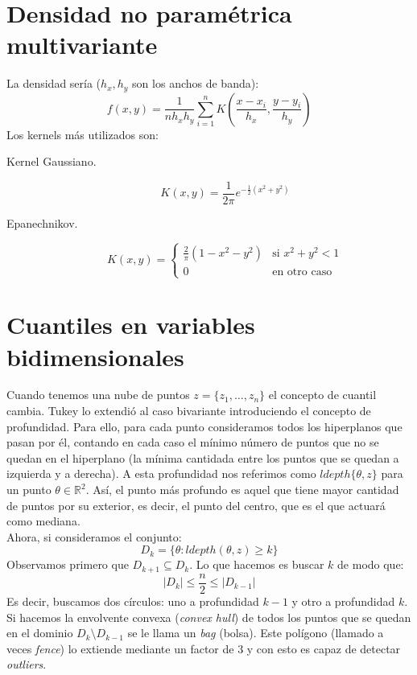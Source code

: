 \section{Densidad no paramétrica multivariante}
\noindent
La densidad sería ($h_x,h_y$ son los anchos de banda):
\begin{equation*}
    f(x,y) = \frac{1}{nh_xh_y}\sum_{i=1}^{n}K\left(\frac{x-x_i}{h_x},\frac{y-y_i}{h_y}\right)
\end{equation*}
Los kernels más utilizados son:
\begin{description}
    \item [Kernel Gaussiano.] 
        \begin{equation*}
            K(x,y) = \frac{1}{2\pi}e^{-\frac{1}{2}(x^2+y^2)}
        \end{equation*}
    \item [Epanechnikov.] 
        \begin{equation*}
            K(x,y) = \left\{\begin{array}{ll}
                \frac{2}{\pi}(1-x^2-y^2) & \text{si\ } x^2+y^2<1  \\
                 0 & \text{en otro caso\ } 
            \end{array}\right. 
        \end{equation*}
\end{description}

\section{Cuantiles en variables bidimensionales}
\noindent %
Cuando tenemos una nube de puntos $z=\{z_1,\ldots,z_n\}$ el concepto de cuantil cambia. Tukey lo extendió al caso bivariante introduciendo el concepto de profundidad. Para ello, para cada punto consideramos todos los hiperplanos que pasan por él, contando en cada caso el mínimo número de puntos que no se quedan en el hiperplano (la mínima cantidada entre los puntos que se quedan a izquierda y a derecha). A esta profundidad nos referimos como $ldepth\{\theta,z\}$ para un punto $\theta\in\mathbb{R}^2$. Así, el punto más profundo es aquel que tiene mayor cantidad de puntos por su exterior, es decir, el punto del centro, que es el que actuará como mediana.\\

\noindent
Ahora, si consideramos el conjunto:
\begin{equation*}
    D_k = \{\theta : ldepth(\theta,z)\geq k\}
\end{equation*}
Observamos primero que $D_{k+1}\subseteq D_k$. Lo que hacemos es buscar $k$ de modo que:
\begin{equation*}
    |D_k| \leq \frac{n}{2} \leq |D_{k-1}|
\end{equation*}
Es decir, buscamos dos círculos: uno a profundidad $k-1$ y otro a profundidad $k$. Si hacemos la envolvente convexa (\textit{convex hull}) de todos los puntos que se quedan en el dominio $D_k\setminus D_{k-1}$ se le llama un \textit{bag} (bolsa). Este polígono (llamado a veces \textit{fence}) lo extiende mediante un factor de $3$ y con esto es capaz de detectar \textit{outliers}.
